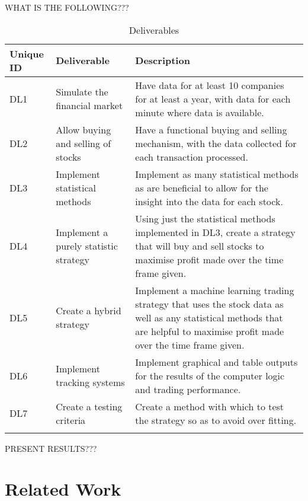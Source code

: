 \documentclass[12pt,a4paper]{article}
\begin{document}
WHAT IS THE FOLLOWING??? \\

\label{units}
\begin{longtable}{ |p{1.5cm}|p{5.5cm}|p{8cm}| }\hline\hline
Unique ID & Deliverable & Description \\ \hline
DL1 & Simulate the financial market & Have data for at least 10 companies for at least a year, with data for each minute where data is available. \\ \hline
DL2 & Allow buying and selling of stocks & Have a functional buying and selling mechanism, with the data collected for each transaction processed. \\ \hline
DL3 & Implement statistical methods & Implement as many statistical methods as are beneficial to allow for the insight into the data for each stock. \\ \hline
DL4 & Implement a purely statistic strategy & Using just the statistical methods implemented in DL3, create a strategy that will buy and sell stocks to maximise profit made over the time frame given. \\ \hline
DL5 & Create a hybrid strategy & Implement a machine learning trading strategy that uses the stock data as well as any statistical methods that are helpful to maximise profit made over the time frame given. \\ \hline
DL6 & Implement tracking systems & Implement graphical and table outputs for the results of the computer logic and trading performance. \\ \hline
DL7 & Create a testing criteria & Create a method with which to test the strategy so as to avoid over fitting. \\ \hline
\caption{Deliverables}
\end{longtable}

PRESENT RESULTS??? \\

\iffalse
#################################################################################
\fi

\section{Related Work}

\iffalse
This section presents a survey of existing work on the problems that this project addresses.  it should be between 2 to 4 pages in length.  The rest of this section shows the formats of subsections as well as some general formatting information for tables, figures, references and equations.
\fi
\end{document}
